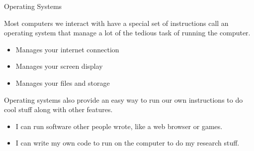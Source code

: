 \documentclass[]{beamer}
\begin{document}
\begin{frame}{Operating Systems}

    Most computers we interact with have a special set of instructions call an operating system that manage a lot of the tedious task of running the computer.

    \begin{itemize}
        \item Manages your internet connection
        \item Manages your screen display
        \item Manages your files and storage
    \end{itemize}

    Operating systems also provide an easy way to run our own instructions to do cool stuff along with other features.

    \begin{itemize}
        \item I can run software other people wrote, like a web browser or games.
        \item I can write my own code to run on the computer to do my research stuff.
    \end{itemize}

\end{frame}
\end{document}

